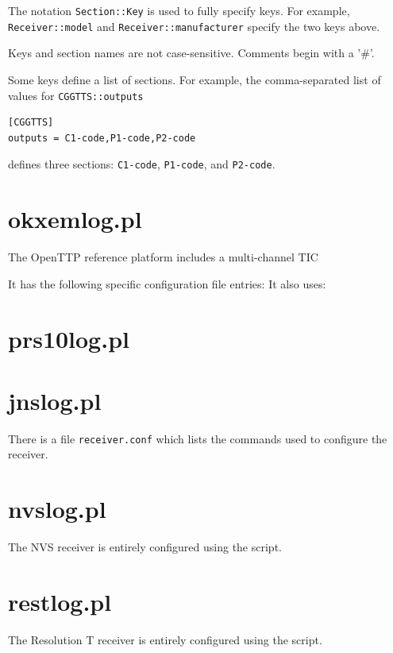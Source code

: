 \documentclass[11pt,a4paper,openany,oneside]{book}
\newcommand{\cc}[1]{{\texttt{#1}}}
\begin{document}
The notation \cc{Section::Key} is used to fully specify keys. For example,
\cc{Receiver::model} and \cc{Receiver::manufacturer} specify the two keys above.

Keys and section names are not case-sensitive. Comments begin with a '\#'.

Some keys define a list of sections. For example, the comma-separated list of values for \cc{CGGTTS::outputs} 
\begin{lstlisting}
[CGGTTS]
outputs = C1-code,P1-code,P2-code
\end{lstlisting}
defines three sections: \cc{C1-code}, \cc{P1-code}, and \cc{P2-code}.









\section{okxemlog.pl}
\hypertarget{h:okxemlog}{}
The OpenTTP reference platform includes a multi-channel TIC

It has the following specific configuration file entries:
It also uses:

\section{prs10log.pl}
\hypertarget{h:prs10log}{}

\section{jnslog.pl}
\hypertarget{h:jnslog}{}
There is a file \cc{receiver.conf} which lists the commands used to configure the receiver.

\section{nvslog.pl}
\hypertarget{h:nvslog}{}

The NVS receiver is entirely configured using the script.

\section{restlog.pl}
\hypertarget{h:restlog}{}

The Resolution T receiver is entirely configured using the script.
\end{document}
